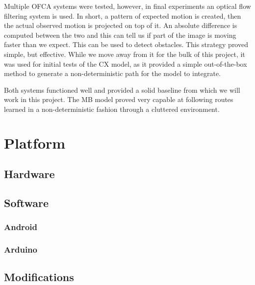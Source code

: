 \documentclass[a4paper,11pt,twoside,openright]{article}
\let\oldsection\section
\def\section{\cleardoublepage\oldsection}
\begin{document}
Multiple OFCA systems were tested, however, in final experiments an
optical flow filtering system is used. In short, a pattern of expected motion is
created, then the actual observed motion is projected on top of it. An absolute
difference is computed between the two and this can tell us if part of the image
is moving faster than we expect. This can be used to detect obstacles. This
strategy proved simple, but effective. While we move away from it for the
bulk of this project, it was used for initial tests of the CX model, as it
provided a simple out-of-the-box method to generate a non-deterministic
path for the model to integrate.
\newline
\par

Both systems functioned well and provided a solid baseline from which we will
work in this project. The MB model proved very capable at following routes
learned in a non-deterministic fashion through a cluttered environment.

\newpage

\section{ Platform } \label{sec:platform}
\subsection{ Hardware }
\subsection{ Software }
\subsubsection{ Android } \label{subsubsec:droid}
\subsubsection{ Arduino }
\subsection{ Modifications }
\newpage
\end{document}
